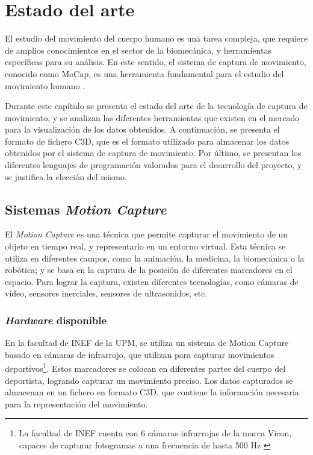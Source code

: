 \chapter{Estado del arte} \label{sec:cap2}

\noindent El estudio del movimiento del cuerpo humano es una tarea compleja, que requiere de amplios conocimientos en el sector de la biomecánica, y herramientas específicas para su análisis. En este sentido, el sistema de captura de movimiento, conocido como \ac{MoCap}, es una herramienta fundamental para el estudio del movimiento humano \autocite{taiQueEsMotion2024}.

Durante este capítulo se presenta el estado del arte de la tecnología de captura de movimiento, y se analizan las diferentes herramientas que existen en el mercado para la visualización de los datos obtenidos. A continuación, se presenta el formato de fichero \ac{C3D}, que es el formato utilizado para almacenar los datos obtenidos por el sistema de captura de movimiento. Por último, se presentan los diferentes lenguajes de programación valorados para el desarrollo del proyecto, y se justifica la elección del mismo.

\section{Sistemas \textit{Motion Capture}}
El \textit{Motion Capture} es una técnica que permite capturar el movimiento de un objeto en tiempo real, y representarlo en un entorno virtual. Esta técnica se utiliza en diferentes campos, como la animación, la medicina, la biomecánica o la robótica; y se basa en la captura de la posición de diferentes marcadores en el espacio. Para lograr la captura, existen diferentes tecnologías, como cámaras de vídeo, sensores inerciales, sensores de ultrasonidos, etc. \autocite{taiQueEsMotion2024}

\subsection{\textit{Hardware} disponible}
En la facultad de \ac{INEF} de la \ac{UPM}, se utiliza un sistema de Motion Capture basado en cámaras de infrarrojo, que utilizan para capturar movimientos deportivos\footnote{La facultad de INEF cuenta con 6 cámaras infrarrojas de la marca Vicon, capaces de capturar fotogramas a una frecuencia de hasta 500 \ac{Hz} \autocite{FacultadCienciasActividad}}. Estos marcadores se colocan en diferentes partes del cuerpo del deportista, logrando capturar un movimiento preciso. Los datos capturados se almacenan en un fichero en formato \ac{C3D}, que contiene la información necesaria para la representación del movimiento.

